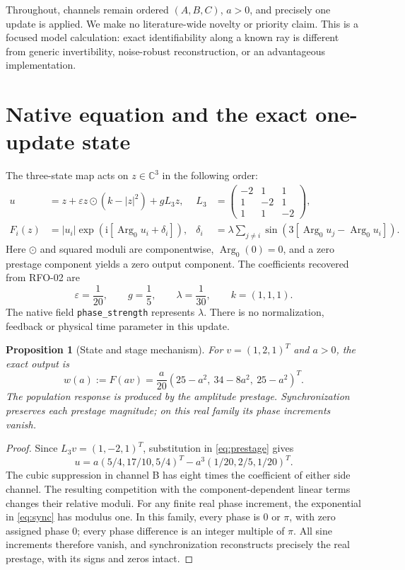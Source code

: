 \documentclass[11pt,a4paper]{article}
\newtheorem{proposition}{Proposition}
\newcommand{\C}{\mathbb C}
\newcommand{\Argz}{\operatorname{Arg}_0}
\begin{document}
Throughout, channels remain ordered $(A,B,C)$, $a>0$, and precisely one update is applied. We make no literature-wide novelty or priority claim. This is a focused model calculation: exact identifiability along a known ray is different from generic invertibility, noise-robust reconstruction, or an advantageous implementation.

\clearpage
\section{Native equation and the exact one-update state}\label{sec:state}
The three-state map acts on $z\in\C^3$ in the following order:
\begin{align}
u&=z+\varepsilon z\odot(k-|z|^2)+gL_3z,
&L_3&=\begin{pmatrix}-2&1&1\\1&-2&1\\1&1&-2\end{pmatrix},\label{eq:prestage}\\
F_i(z)&=|u_i|\exp\!\left(\mathrm i[\Argz u_i+\delta_i]\right),
&\delta_i&=\lambda\sum_{j\ne i}\sin\!\left(3[\Argz u_j-\Argz u_i]\right).\label{eq:sync}
\end{align}
Here $\odot$ and squared moduli are componentwise, $\Argz(0)=0$, and a zero prestage component yields a zero output component. The coefficients recovered from RFO-02 are
\begin{equation}
\varepsilon=\frac1{20},\qquad g=\frac15,\qquad
\lambda=\frac1{30},\qquad k=(1,1,1).\label{eq:coefficients}
\end{equation}
The native field \texttt{phase\_strength} represents $\lambda$. There is no normalization, feedback or physical time parameter in this update.

\begin{proposition}[State and stage mechanism]\label{prop:state}
For $v=(1,2,1)^T$ and $a>0$, the exact output is
\begin{equation}
w(a):=F(av)=\frac a{20}(25-a^2,\ 34-8a^2,\ 25-a^2)^T.\label{eq:state}
\end{equation}
The population response is produced by the amplitude prestage. Synchronization preserves each prestage magnitude; on this real family its phase increments vanish.
\end{proposition}
\begin{proof}
Since $L_3v=(1,-2,1)^T$, substitution in \eqref{eq:prestage} gives
\begin{equation}
u=a(5/4,17/10,5/4)^T-a^3(1/20,2/5,1/20)^T.\label{eq:powers}
\end{equation}
The cubic suppression in channel B has eight times the coefficient of either side channel. The resulting competition with the component-dependent linear terms changes their relative moduli. For any finite real phase increment, the exponential in \eqref{eq:sync} has modulus one. In this family, every phase is $0$ or $\pi$, with zero assigned phase $0$; every phase difference is an integer multiple of $\pi$. All sine increments therefore vanish, and synchronization reconstructs precisely the real prestage, with its signs and zeros intact.
\end{proof}
\end{document}

